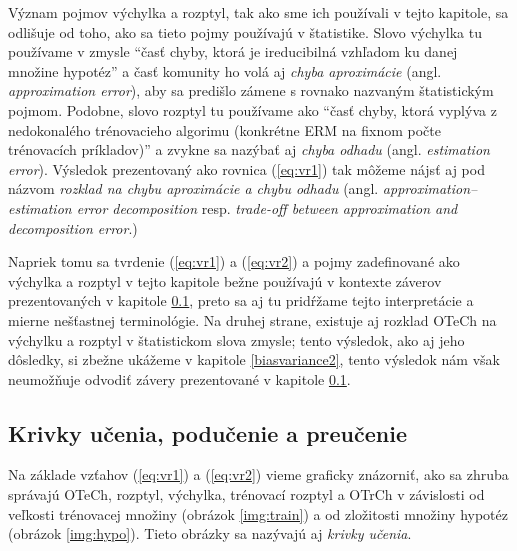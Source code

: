 \begin{remark}
Význam pojmov výchylka a rozptyl, tak ako sme ich používali v tejto
kapitole, sa odlišuje od toho, ako sa tieto pojmy používajú v
štatistike.  Slovo výchylka tu používame v zmysle ``časť chyby, ktorá
je ireducibilná vzhľadom ku danej množine hypotéz'' a časť komunity ho
volá aj \emph{chyba aproximácie} (angl. \emph{approximation error}),
aby sa predišlo zámene s rovnako nazvaným štatistickým
pojmom. Podobne, slovo rozptyl tu používame ako ``časť chyby, ktorá
vyplýva z nedokonalého trénovacieho algorimu (konkrétne ERM na fixnom
počte trénovacích príkladov)'' a zvykne sa nazýbať aj \emph{chyba
odhadu} (angl. \emph{estimation error}).  Výsledok prezentovaný ako
rovnica (\ref{eq:vr1}) tak môžeme nájsť aj pod názvom \emph{rozklad
na chybu aproximácie a chybu odhadu} (angl. \emph{approximation--estimation
error decomposition} resp. \emph{trade-off between approximation and
decomposition error}.)

Napriek tomu sa tvrdenie (\ref{eq:vr1}) a (\ref{eq:vr2}) a pojmy
zadefinované ako výchylka a rozptyl v tejto kapitole bežne používajú
v kontexte záverov prezentovaných v kapitole \ref{krivky}, preto sa
aj tu pridŕžame tejto interpretácie a mierne nešťastnej terminológie.
Na druhej strane, existuje
aj rozklad OTeCh na výchylku a rozptyl v štatistickom slova zmysle;
tento výsledok, ako aj jeho dôsledky, si zbežne ukážeme v kapitole
\ref{biasvariance2}, tento výsledok nám však neumožňuje odvodiť závery
prezentované v kapitole \ref{krivky}.
\end{remark}



\subsection{Krivky učenia, podučenie a preučenie}
\label{krivky}

Na základe vzťahov (\ref{eq:vr1}) a (\ref{eq:vr2})
vieme graficky znázorniť, ako sa zhruba správajú
OTeCh, rozptyl, výchylka, trénovací rozptyl a OTrCh v závislosti
od veľkosti trénovacej množiny (obrázok \ref{img:train}) a od zložitosti
množiny hypotéz (obrázok \ref{img:hypo}). Tieto obrázky sa nazývajú
aj \emph{krivky učenia}.


